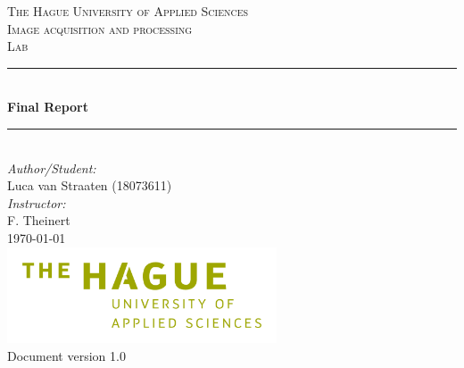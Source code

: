 \documentclass[a4paper]{article}
\begin{document}
\begin{titlepage}

\newcommand{\HRule}{\rule{\linewidth}{0.5mm}} 							%
\center 
 
\textsc{\LARGE The Hague University of Applied Sciences}\\[1cm]

\textsc{\Large Image acquisition and processing}\\[0.2cm]
\textsc{\large Lab}\\[1cm] 										%
\HRule \\[0.8cm]
{ \huge \bfseries Final Report}\\[0.7cm]								%
\HRule \\[2cm]
\large
\emph{Author/Student:}\\
Luca van Straaten (18073611)\\[1.5cm]													%
\emph{Instructor:}\\
F.  Theinert\\[1.5cm]										
{\large \today}\\[5cm]
\includegraphics[width=0.6\textwidth]{images/hhs.png}\\[1cm] 	%
\vfill
Document version 1.0
\end{titlepage}


\newpage
  \tableofcontents
\newpage
{}












\newpage


\end{document}
